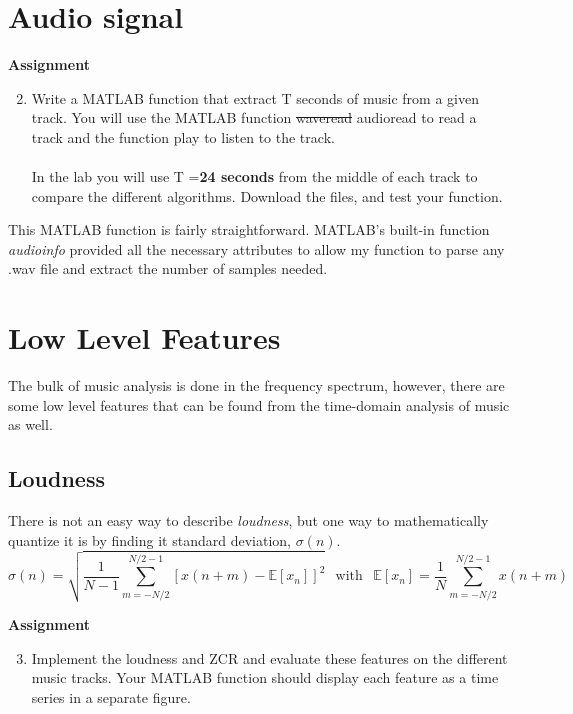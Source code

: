 \documentclass{article} %
\begin{document}
\section{Audio signal}

\begin{framed}
\textbf{Assignment}
\begin{enumerate}
\setcounter{enumi}{1}
\item Write a MATLAB function that extract T seconds of music from a given track. You
will use the MATLAB function \sout{waveread} audioread to read a track and the function play to
listen to the track.\\\\
In the lab you will use T =\textbf{24 seconds} from the middle of each track to compare the
different algorithms. Download the files, and test your function.
\end{enumerate}
\end{framed}

This MATLAB function is fairly straightforward. MATLAB's built-in function \textit{audioinfo} provided all the necessary attributes to allow my function to parse
any .wav file and extract the number of samples needed. 

\section{Low Level Features}
The bulk of music analysis is done in the frequency spectrum, however, 
there are some low level features that can be found from the time-domain
analysis of music as well. 
\subsection{Loudness}
There is not an easy way to describe \textit{loudness}, but 
one way to mathematically quantize it is by finding it
standard deviation, $\sigma(n)$. \\
\begin{equation}\label{eq:loud_std}
\sigma(n)=\sqrt{\frac{1}{N-1} \sum\limits_{m=-N/2}^{N/2-1} 
[ x(n+m)-\mathbb{E}[x_n]]^2 }\hspace{5pt} \text{ with }\hspace{5pt} 
\mathbb{E}[x_n]=\frac{1}{N}\sum\limits_{m=-N/2}^{N/2-1}x(n+m)
\end{equation}

\begin{framed}
\textbf{Assignment}
\begin{enumerate}
\setcounter{enumi}{2}
\item Implement the loudness and ZCR and evaluate these features on the different music
tracks. Your MATLAB function should display each feature as a time series in a separate
figure.
\end{enumerate}
\end{framed}
\end{document}
